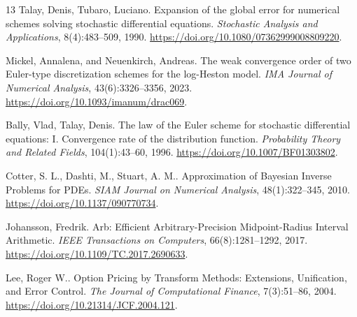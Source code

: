 \begin{thebibliography}{13}
Talay, Denis, Tubaro, Luciano.
Expansion of the global error for numerical schemes solving stochastic differential equations.
\emph{Stochastic Analysis and Applications}, 8(4):483--509, 1990.
\url{https://doi.org/10.1080/07362999008809220}.

Mickel, Annalena, and Neuenkirch, Andreas.
The weak convergence order of two {Euler}-type discretization schemes for the log-{Heston} model.
\emph{IMA Journal of Numerical Analysis}, 43(6):3326--3356, 2023.
\url{https://doi.org/10.1093/imanum/drac069}.

Bally, Vlad, Talay, Denis.
The law of the {Euler} scheme for stochastic differential equations: {I}. {Convergence} rate of the distribution function.
\emph{Probability Theory and Related Fields}, 104(1):43--60, 1996.
\url{https://doi.org/10.1007/BF01303802}.

Cotter, S. L., Dashti, M., Stuart, A. M..
Approximation of {Bayesian} Inverse Problems for {PDEs}.
\emph{SIAM Journal on Numerical Analysis}, 48(1):322--345, 2010.
\url{https://doi.org/10.1137/090770734}.

Johansson, Fredrik.
{Arb}: Efficient Arbitrary-Precision Midpoint-Radius Interval Arithmetic.
\emph{IEEE Transactions on Computers}, 66(8):1281--1292, 2017.
\url{https://doi.org/10.1109/TC.2017.2690633}.

Lee, Roger W..
Option Pricing by Transform Methods: Extensions, Unification, and Error Control.
\emph{The Journal of Computational Finance}, 7(3):51--86, 2004.
\url{https://doi.org/10.21314/JCF.2004.121}.

\end{thebibliography}
